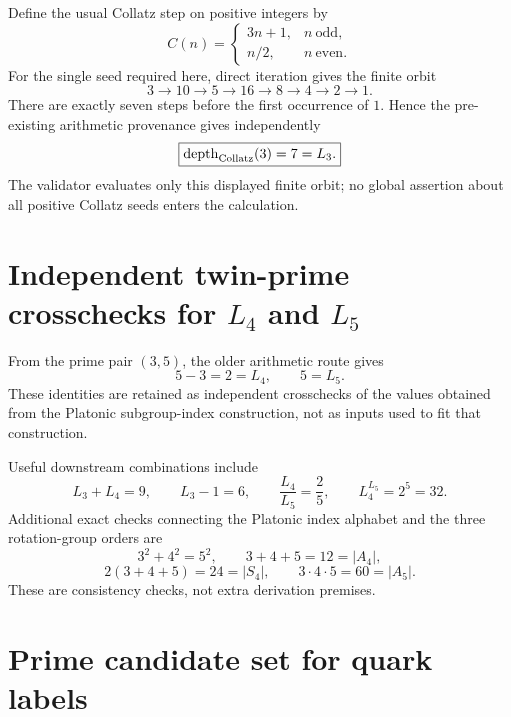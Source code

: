 Define the usual Collatz step on positive integers by
\begin{equation}
C(n)=
\begin{cases}
3n+1, & n\ \text{odd},\\
n/2, & n\ \text{even}.
\end{cases}
\label{eq:v12-collatz-map}
\end{equation}
For the single seed required here, direct iteration gives the finite orbit
\begin{equation}
\boxed{
3\to10\to5\to16\to8\to4\to2\to1.
}
\label{eq:v12-collatz-three-orbit}
\end{equation}
There are exactly seven steps before the first occurrence of \(1\).  Hence the
pre-existing arithmetic provenance gives independently
\begin{equation}
\boxed{\operatorname{depth}_{\rm Collatz}(3)=7=L_3.}
\label{eq:v12-L3}
\end{equation}
The validator evaluates only this displayed finite orbit; no global assertion
about all positive Collatz seeds enters the calculation.

\section[Independent twin-prime crosschecks for L4 and L5]{Independent twin-prime crosschecks for $L_4$ and $L_5$}

From the prime pair \((3,5)\), the older arithmetic route gives
\begin{equation}
\boxed{5-3=2=L_4,}
\qquad
\boxed{5=L_5.}
\label{eq:v12-L4-L5}
\end{equation}
These identities are retained as independent crosschecks of the values obtained
from the Platonic subgroup-index construction, not as inputs used to fit that
construction.

Useful downstream combinations include
\[
L_3+L_4=9,
\qquad
L_3-1=6,
\qquad
\frac{L_4}{L_5}=\frac25,
\qquad
L_4^{L_5}=2^5=32.
\]
Additional exact checks connecting the Platonic index alphabet and the three
rotation-group orders are
\[
3^2+4^2=5^2,
\qquad
3+4+5=12=|A_4|,
\]
\[
2(3+4+5)=24=|S_4|,
\qquad
3\cdot4\cdot5=60=|A_5|.
\]
These are consistency checks, not extra derivation premises.

\section{Prime candidate set for quark labels}

